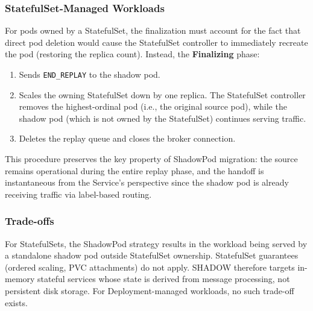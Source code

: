 \documentclass[conference]{IEEEtran}
\begin{document}
\subsubsection{StatefulSet-Managed Workloads}
\label{sec:shadowpod-statefulset}

For pods owned by a StatefulSet, the finalization must account for the fact
that direct pod deletion would cause the StatefulSet controller to immediately
recreate the pod (restoring the replica count). Instead, the \textbf{Finalizing}
phase:

\begin{enumerate}
\item Sends \texttt{END\_REPLAY} to the shadow pod.
\item Scales the owning StatefulSet down by one replica. The StatefulSet
  controller removes the highest-ordinal pod (i.e., the original source pod),
  while the shadow pod (which is not owned by the StatefulSet) continues
  serving traffic.
\item Deletes the replay queue and closes the broker connection.
\end{enumerate}

This procedure preserves the key property of ShadowPod migration: the source
remains operational during the entire replay phase, and the handoff is
instantaneous from the Service's perspective since the shadow pod is already
receiving traffic via label-based routing.

\subsubsection{Trade-offs}
\label{sec:shadowpod-tradeoffs}

For StatefulSets, the ShadowPod strategy results in the workload being served
by a standalone shadow pod outside StatefulSet ownership. StatefulSet guarantees
(ordered scaling, PVC attachments) do not apply. SHADOW therefore targets
in-memory stateful services whose state is derived from message processing, not
persistent disk storage. For Deployment-managed workloads, no such trade-off
exists.
\end{document}
